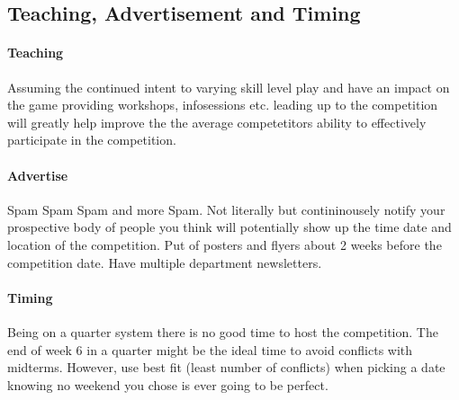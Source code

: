 \documentclass[10pt]{article}
\begin{document}
\subsection{Teaching, Advertisement and Timing}

\paragraph{Teaching}
Assuming the continued intent to varying skill level play and have an impact on the game
providing workshops, infosessions etc. leading up to the competition will greatly help 
improve the the average competetitors ability to effectively participate in the competition.

\paragraph{Advertise}
Spam Spam Spam and more Spam. Not literally but contininousely notify your prospective body
of people you think will potentially show up the time date and location of the competition.
Put of posters and flyers about 2 weeks before the competition date. Have  multiple
department newsletters.

\paragraph{Timing}
Being on a quarter system there is no good time to host the competition. The end of week 6 
in a quarter might be the ideal time to avoid conflicts with midterms. However, 
use best fit (least number of conflicts) when picking a date knowing no weekend you chose is ever going to be perfect.
\end{document}
